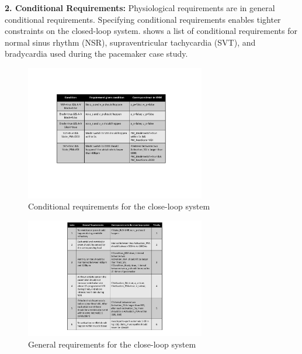 \noindent
\textbf{2. Conditional Requirements:} Physiological requirements are in general conditional requirements. Specifying conditional requirements enables tighter constraints on the closed-loop system.  shows a list of conditional requirements for normal sinus rhythm (NSR), supraventricular tachycardia (SVT), and bradycardia used during the pacemaker case study. 
\begin{figure}
	\center
	\includegraphics[width=0.7\textwidth]{figs/conditional.pdf}
	\center
	\vspace{-10pt}
	\caption{Conditional requirements for the close-loop system}
	\label{fig:conditional}
\end{figure}
\begin{figure}
	\center
	\includegraphics[width=0.7\textwidth]{figs/properties.pdf}
	\center
	\vspace{-10pt}
	\caption{General requirements for the close-loop system}
	\label{fig:properties}
\end{figure}

